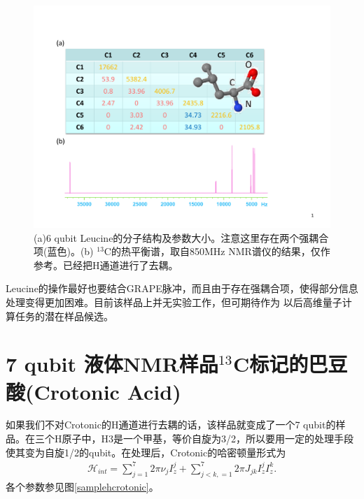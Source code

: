 \begin{figure}[htbp]
            \begin{center}
              \includegraphics[width= 0.8\columnwidth]{figures/sampleleucine.pdf}
              \caption{(a)6 qubit Leucine的分子结构及参数大小。注意这里存在两个强耦合项(蓝色)。(b) $^{13}$C的热平衡谱，取自850MHz NMR谱仪的结果，仅作参考。已经把H通道进行了去耦。}
              \label{sampleleucine}
            \end{center}
\end{figure}

Leucine的操作最好也要结合GRAPE脉冲，而且由于存在强耦合项，使得部分信息处理变得更加困难。目前该样品上并无实验工作，但可期待作为
以后高维量子计算任务的潜在样品候选。

\section{7 qubit 液体NMR样品$^{13}$C标记的巴豆酸(Crotonic Acid)}

如果我们不对Crotonic的H通道进行去耦的话，该样品就变成了一个7 qubit的样品。在三个H原子中，H3是一个甲基，等价自旋为3/2，所以要用一定的处理手段使其变为自旋1/2的qubit。在处理后，Crotonic的哈密顿量形式为
\begin{eqnarray}
\mathcal{H}_{int}=\sum\limits_{j=1}^7 {2\pi \nu _j } I_z^j  + \sum\limits_{j < k,=1}^7 {2\pi} J_{jk} I_z^j I_z^k.
\end{eqnarray}
各个参数参见图\ref{samplehcrotonic}。

